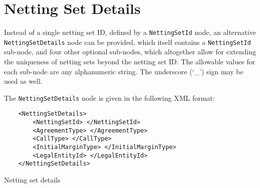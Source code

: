 \ifdefined\RiskCatalogue\newcommand{\customsection}[1]{\section{#1}}
                   \else\newcommand{\customsection}[1]{\subsubsection{#1}}\fi

\customsection{Netting Set Details}\label{sec:nettingsetdetails}

Instead of a single netting set ID, defined by a \lstinline!NettingSetId! node,
an alternative \lstinline!NettingSetDetails! node can be provided, which itself
contains a \lstinline!NettingSetId! sub-node, and four other optional sub-nodes,
which altogether allow for extending the uniqueness of netting sets beyond the
netting set ID. The allowable values for each sub-node are any alphanumeric
string. The underscore (`\_') sign may be used as well.

\vspace{1em}

The \lstinline!NettingSetDetails! node is given in the following XML format:

\begin{listing}[H]
\begin{verbatim}
    <NettingSetDetails>
        <NettingSetId> </NettingSetId>
        <AgreementType> </AgreementType>
        <CallType> </CallType>
        <InitialMarginType> </InitialMarginType>
        <LegalEntityId> </LegalEntityId>
    </NettingSetDetails>
\end{verbatim}
\caption{Netting set details}
\label{lst:nettingsetdetails}
\end{listing}
